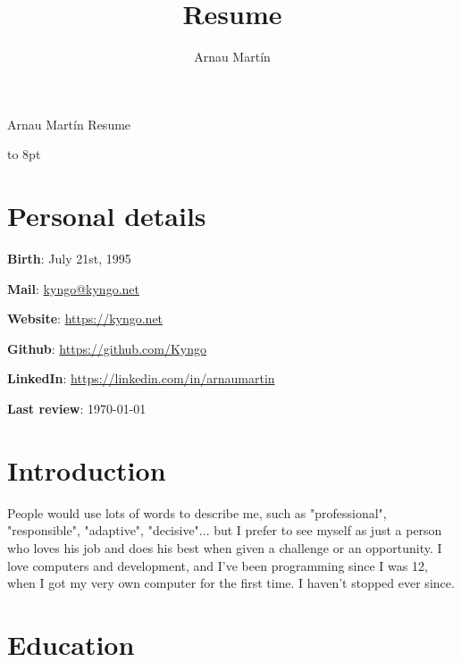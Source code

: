 \documentclass{article}
\author{Arnau Martín}
\title{Resume}
\begin{document}
\setlength{\parindent}{0cm} {
	{\Huge Arnau Martín} \textcolor{Bittersweet}{Resume}
	
	\vspace*{\dimexpr-\baselineskip-\topskip\relax}	
	\vbox to 8pt{\hfill{}}
	
	\section*{Personal details}
	
	\textbf{Birth}: July 21st, 1995

	\textbf{Mail}: \textcolor{Green}{\href{mailto:kyngo@kyngo.net}{kyngo@kyngo.net}}
	
	\textbf{Website}: \textcolor{Green}{\href{https://kyngo.net}{https://kyngo.net}}
	
	\textbf{Github}: \textcolor{Green}{\href{https://github.com/Kyngo}{https://github.com/Kyngo}}
	
	\textbf{LinkedIn}: \textcolor{Green}{\href{https://linkedin.com/in/arnaumartin}{https://linkedin.com/in/arnaumartin}}

	\textbf{Last review}: \today

	\section*{Introduction}
	People would use lots of words to describe me,  such as "professional", "responsible", "adaptive", "decisive"...  
	but I prefer to see myself as just a person who loves his job and does his best when given a challenge or an opportunity. 
	I love computers and development, and I've been programming since I was 12, when I got my very own computer for the first time. 
	I haven't stopped ever since.
	
	\section*{Education}

}
\end{document}

